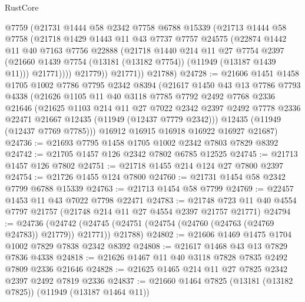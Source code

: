 \begin{lexlean}{RustCore}
\begin{coremodule}
            @7759
            (@21731
              @1444
              @58
              @2342
              @7758
              @6788
              @15339
              (@21713
                @1444
                @58
                @7758
                (@21718
                  @1429
                  @1443
                  @11
                  @43
                  @7737
                  @7757
                  @24575
                  (@22874
                    @1442
                    @11
                    @40
                    @7163
                    @7756
                    @22888
                    (@21718
                      @1440
                      @214
                      @11
                      @27
                      @7754
                      @2397
                      (@21660 @1439 @7754 (@13181 (@13182 @7754)) (@11949 (@13187 @1439 @11)))
                      @21771))))
              @21779))
          @21771))
      @21788)
@24728 := @21606
    @1451
    @1458
    @1705
    @1002
    @7786
    @7795
    @2342
    @8394
    (@21617
      @1450
      @43
      @13
      @7786
      @7793
      @4338
      (@21626
        @1105
        @11
        @40
        @3118
        @7785
        @7792
        @2492
        @7768
        @2336
        @21646
        (@21625
          @1103
          @214
          @11
          @27
          @7022
          @2342
          @2397
          @2492
          @7778
          @2336
          @22471
          @21667
          @12435
          (@11949 (@12437 @7779 @2342)))
        @12435
        (@11949 (@12437 @7769 @7785)))
      @16912
      @16915
      @16918
      @16922
      @16927
      @21687)
@24736 := @21693 @7795 @1458 @1705 @1002 @2342 @7803 @7829 @8392
@24742 := @21705 @1457 @126 @2342 @7802 @6785 @12525
@24745 := @21713 @1457 @126 @7802
@24751 := @21718 @1455 @214 @124 @27 @7800 @2397
@24754 := @21726 @1455 @124 @7800
@24760 := @21731 @1454 @58 @2342 @7799 @6788 @15339
@24763 := @21713 @1454 @58 @7799
@24769 := @22457 @1453 @11 @43 @7022 @7798 @22471
@24783 := @21748 @723 @11 @40 @4554 @7797 @21757 (@21748 @214 @11 @27 @4554 @2397 @21757 @21771)
@24794 := @24736
    (@24742 (@24745 (@24751 (@24754 (@24760 (@24763 (@24769 @24783)) @21779)) @21771)) @21788)
@24802 := @21606 @1469 @1475 @1704 @1002 @7829 @7838 @2342 @8392
@24808 := @21617 @1468 @43 @13 @7829 @7836 @4338
@24818 := @21626 @1467 @11 @40 @3118 @7828 @7835 @2492 @7809 @2336 @21646
@24828 := @21625 @1465 @214 @11 @27 @7825 @2342 @2397 @2492 @7819 @2336
@24837 := @21660 @1464 @7825 (@13181 (@13182 @7825)) (@11949 (@13187 @1464 @11))

\end{coremodule}
\end{lexlean}

